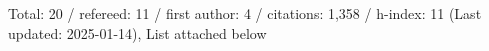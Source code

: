Total: 20 / refereed: 11 / first author: 4 / citations: 1,358 / h-index: 11 (Last updated: 2025-01-14), List attached below